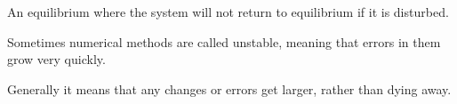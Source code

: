 An equilibrium where the system will not return to equilibrium if
it is disturbed.
\par
Sometimes numerical methods are called unstable, meaning that
errors in them grow very quickly.
\par
Generally it means that any changes or errors get larger,
rather than dying away.